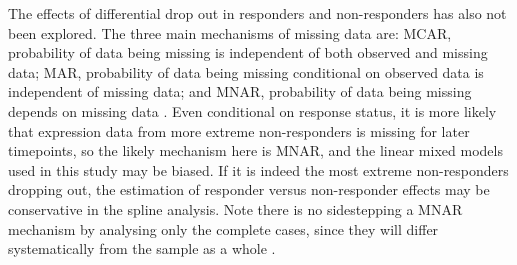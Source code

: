 The effects of differential drop out in responders and non-responders has also not been explored.
The three main mechanisms of missing data are:
\gls{MCAR}, probability of data being missing is independent of both observed and missing data;
\gls{MAR}, probability of data being missing conditional on observed data is independent of missing data;
and \gls{MNAR}, probability of data being missing depends on missing data \autocite{liu2016MethodsHandlingMissing}.
Even conditional on response status, it is more likely that expression data from more extreme non-responders is missing for later timepoints, so the likely mechanism here is \gls{MNAR},
and the linear mixed models used in this study may be biased.
If it is indeed the most extreme non-responders dropping out, the estimation of responder versus non-responder effects may be conservative in the spline analysis.
Note there is no sidestepping a \gls{MNAR} mechanism by analysing only the complete cases, 
since they will differ systematically from the sample as a whole \autocite{ibrahim2009MissingDataMethods}.

